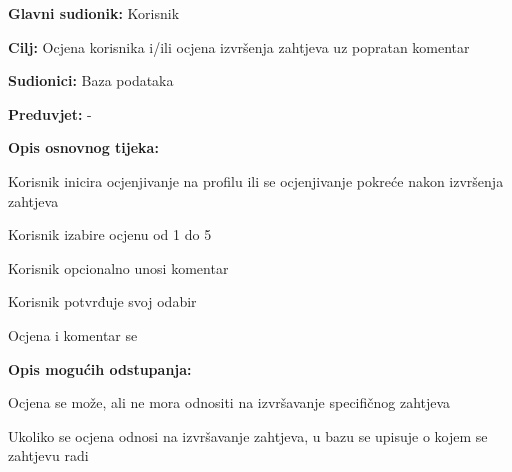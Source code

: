 		
			\noindent {}
			\begin{packed_item}
				
				\item \textbf{Glavni sudionik: }Korisnik
				\item  \textbf{Cilj:} Ocjena korisnika i/ili ocjena izvršenja zahtjeva uz popratan komentar 
				\item  \textbf{Sudionici:} Baza podataka
				\item  \textbf{Preduvjet:} -
				\item  \textbf{Opis osnovnog tijeka:}
				
				\item[] \begin{packed_enum}
					
					\item Korisnik inicira ocjenjivanje na profilu ili se ocjenjivanje pokreće nakon izvršenja zahtjeva
					\item Korisnik izabire ocjenu od 1 do 5
					\item Korisnik opcionalno unosi komentar
					\item Korisnik potvrđuje svoj odabir
					\item Ocjena i komentar se
				\end{packed_enum}
				
				\item  \textbf{Opis mogućih odstupanja:}
				
				\item[] \begin{packed_item}
					
					\item[2.a] Ocjena se može, ali ne mora odnositi na izvršavanje specifičnog zahtjeva
					\item[] \begin{packed_enum}
						
						\item Ukoliko se ocjena odnosi na izvršavanje zahtjeva, u bazu se upisuje o kojem se zahtjevu radi
						
					\end{packed_enum}
					
				\end{packed_item}
			\end{packed_item}
		
